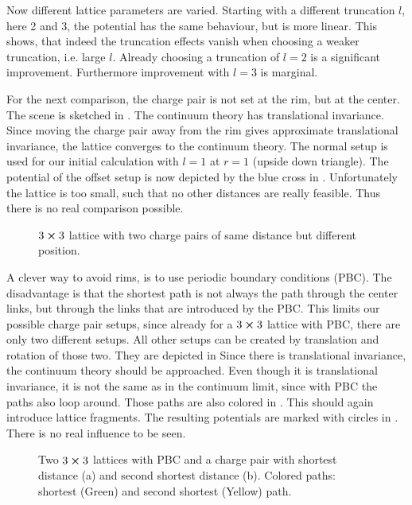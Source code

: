 Now different lattice parameters are varied.
Starting with a different truncation $l$, here 2 and 3, the potential has the same behaviour, but is more linear. This shows, that indeed the truncation effects vanish when choosing a weaker truncation, i.e. large $l$. Already choosing a truncation of $l=2$ is a significant improvement. Furthermore improvement with $l=3$ is marginal.

For the next comparison, the charge pair is not set at the rim, but at the center. The scene is sketched in . The continuum theory has translational invariance. Since moving the charge pair away from the rim gives approximate translational invariance, the lattice converges to the continuum theory. The normal setup is used for our initial calculation with $l=1$ at $r=1$ (upside down triangle). The potential of the offset setup is now depicted by the blue cross in . Unfortunately the lattice is too small, such that no other distances are really feasible. Thus there is no real comparison possible.
\begin{figure}[h]
	\begin{center}
		
		\caption{$3\cross 3$ lattice with two charge pairs of same distance but different position.}\label{fig:3x3no}
	\end{center}
\end{figure}

A clever way to avoid rims, is to use periodic boundary conditions (PBC). The disadvantage is that the shortest path is not always the path through the center links, but through the links that are introduced by the PBC. This limits our possible charge pair setups, since already for a $3 \cross 3$ lattice with PBC, there are only two different setups. All other setups can be created by translation and rotation of those two. They are depicted in 
Since there is translational invariance, the continuum theory should be approached. Even though it is translational invariance, it is not the same as in the continuum limit, since with PBC the paths also loop around. Those paths are also colored in . This should again introduce lattice fragments.
The resulting potentials are marked with circles in . There is no real influence to be seen.
\begin{figure}[h]
	\begin{center}
		\subfloat[]{
			\scalebox{0.7}{
				
			}
		}
		\subfloat[]{
			\scalebox{0.7}{
				
			}
		}
		\caption{Two $3\cross3$ lattices with PBC and a charge pair with shortest distance (a) and second shortest distance (b). Colored paths: shortest (Green) and second shortest (Yellow) path.} \label{fig:3x3pbcv1}
	\end{center}
\end{figure}

